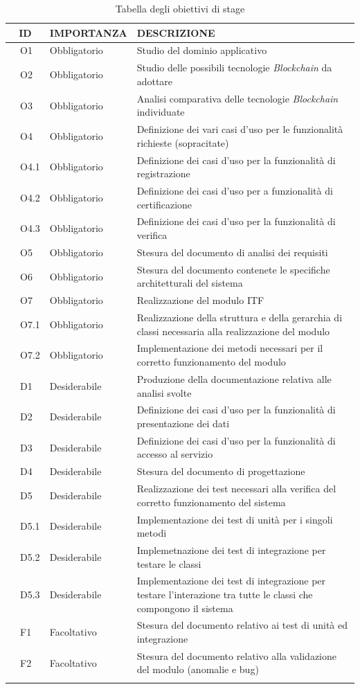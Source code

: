 \begin{longtable}{|r l|p{3cm}|p{10cm}|}
	\hline
	\multicolumn{2}{|c|}{\textbf{ID}} & \textbf{IMPORTANZA} & \textbf{DESCRIZIONE}\tabularnewline
	\hline
	& O1 & Obbligatorio & Studio del dominio applicativo \\\hline
	& O2 & Obbligatorio & Studio delle possibili tecnologie \textit{Blockchain} da adottare \\\hline
	& O3 & Obbligatorio & Analisi comparativa delle tecnologie \textit{Blockchain} individuate \\\hline
	& O4 & Obbligatorio & Definizione dei vari casi d'uso per le funzionalità richieste (sopracitate) \\\hline
	& O4.1 & Obbligatorio & Definizione dei casi d'uso per la funzionalità di registrazione \\\hline
	& O4.2 & Obbligatorio & Definizione dei casi d'uso per a funzionalità di certificazione \\\hline
	& O4.3 & Obbligatorio & Definizione dei casi d'uso per la funzionalità di verifica \\\hline
	& O5 & Obbligatorio & Stesura del documento di analisi dei requisiti\\\hline
	& O6 & Obbligatorio & Stesura del documento contenete le specifiche architetturali del sistema \\\hline
	& O7 & Obbligatorio & Realizzazione del modulo \gls{ITF}\\\hline
	& O7.1 & Obbligatorio & Realizzazione della struttura e della gerarchia di classi necessaria alla realizzazione del modulo \\\hline
	& O7.2 & Obbligatorio & Implementazione dei metodi necessari per il corretto funzionamento del modulo\\\hline
	& D1 & Desiderabile & Produzione della documentazione relativa alle analisi svolte \\\hline
	& D2 & Desiderabile & Definizione dei casi d'uso per la funzionalità di presentazione dei dati \\\hline
	& D3 & Desiderabile & Definizione dei casi d'uso per la funzionalità di accesso al servizio \\\hline
	& D4 & Desiderabile & Stesura del documento di progettazione\\\hline
	& D5 & Desiderabile & Realizzazione dei test necessari alla verifica del corretto funzionamento del sistema\\\hline
	& D5.1 & Desiderabile & Implementazione dei test di unità per i singoli metodi\\\hline
	& D5.2 & Desiderabile & Implemetnazione dei test di integrazione per testare le classi \\\hline
	& D5.3 & Desiderabile & Implementazione dei test di integrazione per testare l'interazione tra tutte le classi che compongono il sistema \\\hline
	& F1 & Facoltativo & Stesura del documento relativo ai test di unità ed integrazione \\\hline	
	& F2 & Facoltativo & Stesura del documento relativo alla validazione del modulo (anomalie e bug) \\\hline
	\caption{Tabella degli obiettivi di stage}
\end{longtable}
